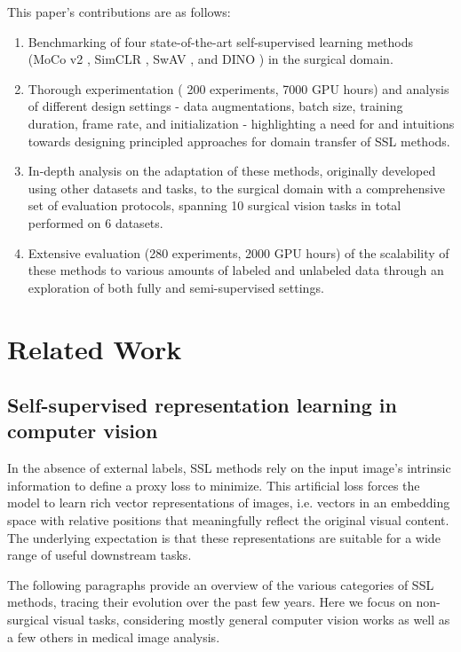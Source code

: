 \documentclass[times,twocolumn,final]{elsarticle}
\begin{document}
This paper's contributions are as follows:

\begin{enumerate}
    \item Benchmarking of four state-of-the-art self-supervised learning methods (MoCo v2 \citep{chen2020improved}, SimCLR \citep{chen2020simple}, SwAV \citep{caron2020unsupervised}, and DINO \citep{caron2021emerging}) in the surgical domain.

    \item Thorough experimentation (
    200 experiments, 7000 GPU hours) and analysis of different design settings - data augmentations, batch size, training duration, frame rate, and initialization - highlighting a need for and intuitions towards designing principled approaches for domain transfer of SSL methods.

    \item In-depth analysis on the adaptation of these methods, originally developed using other datasets and tasks, to the surgical domain with a comprehensive set of evaluation protocols, {\color{changetext} spanning 10 surgical vision tasks in total performed on 6 datasets}.
    
    \item Extensive evaluation (280 experiments, 2000 GPU hours) of the scalability of these methods to various amounts of labeled and unlabeled data through an exploration of both fully and semi-supervised settings.
\end{enumerate}

\section{Related Work}
{\color{changetext} \subsection{Self-supervised representation learning in computer vision}}
\label{sec:ssl_general}
In the absence of external labels, SSL methods rely on the input image's intrinsic information to define a proxy loss to minimize. This artificial loss forces the model to learn rich vector representations of images, i.e. vectors in an embedding space with relative positions that meaningfully reflect the original visual content. The underlying expectation is that these representations are suitable for a wide range of useful downstream tasks.

The following paragraphs provide an overview of the various categories of SSL methods, tracing their evolution over the past few years. {\color{changetext} Here we focus on non-surgical visual tasks, considering mostly general computer vision works as well as a few others in medical image analysis.}
\end{document}
